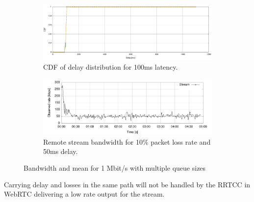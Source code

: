 \begin{figure}[h]
        \centering
        \begin{subfigure}[b]{1\textwidth}
                \centering
                \includegraphics[width=\textwidth]{./figures/total_delay_distribution_plr_delay.pdf}
      \caption[CDF of delay distribution for 100ms latency]{CDF of delay distribution for 100ms latency.}
	\label{fig:plr10_100ms_cdf}
        \end{subfigure}
        \qquad

        \begin{subfigure}[b]{1\textwidth}
                \centering
                \includegraphics[width=\textwidth]{./figures/plr10_rtt50ms_RV.pdf}
      \caption[Remote stream bandwidth for 10\% packet loss rate and 50ms delay]{Remote stream bandwidth for 10\% packet loss rate and 50ms delay.}
	\label{fig:bw_plr10_rtt50ms}
        \end{subfigure}
        
        \caption{Bandwidth and mean for 1 Mbit/s with multiple queue sizes}
        \label{fig:cdf_and_delay}
\end{figure}



Carrying delay and losses in the same path will not be handled by the RRTCC in WebRTC delivering a low rate output for the stream.

